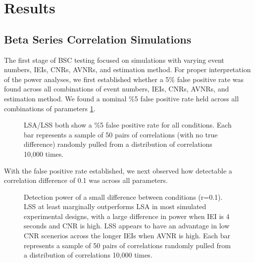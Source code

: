 \documentclass[10pt,letterpaper]{article}
\begin{document}
\section*{Results}
\label{results}

\subsection*{Beta Series Correlation Simulations}
\label{results:bsc-simulations}

The first stage of BSC testing focused on simulations with varying event numbers,
IEIs, CNRs, AVNRs, and estimation method.
For proper interpretation of the power analyses, we first established whether
a 5\% false positive rate was found across all combinations of
event numbers, IEIs, CNRs, AVNRs, and estimation method.
We found a nominal \%5 false positive rate held across all combinations
of parameters \ref{fig:res_sim_fpr}.

\begin{figure}[H]
  \centering


  \caption{
    LSA/LSS both show a \%5 false positive rate for all conditions.
    Each bar represents a sample of 50 pairs of correlations (with no true difference)
    randomly pulled from a distribution of correlations 10,000 times.
  }
  \label{fig:res_sim_fpr}
\end{figure}

With the false positive rate established, we next observed how detectable a
correlation difference of 0.1 was across all parameters.

\begin{figure}[H]
  \centering


  \caption{
    Detection power of a small difference between conditions (r=0.1).
    LSS at least marginally outperforms LSA in most simulated experimental
    designs, with a large difference in power when IEI is 4 seconds and
    CNR is high.
    LSS appears to have an advantage in low CNR scenerios across the longer IEIs
    when AVNR is high.
    Each bar represents a sample of 50 pairs of correlations
    randomly pulled from a distribution of correlations 10,000 times.
  }
  \label{fig:res_sim_smalldiff}
\end{figure}
\end{document}
